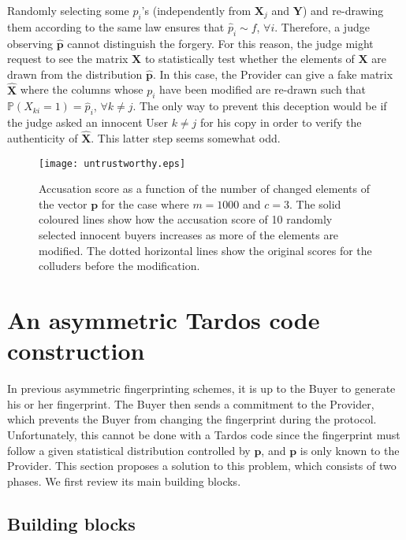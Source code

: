 \documentclass{article}
\begin{document}
Randomly selecting some $p_{i}$'s (independently from $\mathbf{X}_j$
and $\mathbf{Y}$) and re-drawing them according to the same law
ensures that $\hat{p}_{i}\sim f$, $\forall i$.  Therefore, a judge
observing $\hat{\mathbf{p}}$ cannot distinguish the forgery.  For this
reason, the judge might request to see the matrix $\mathbf{X}$ to statistically test
whether the elements of $\mathbf{X}$ are drawn from the distribution
$\hat{\mathbf{p}}$. In this case, the
Provider can give a fake matrix $\hat{\mathbf{X}}$ where the columns
whose $p_{i}$ have been modified are re-drawn such that
$\mathbb{P}(X_{ki} = 1) = \hat{p}_i$, $\forall k\neq j$. 
The only way to prevent this deception would be if the
judge asked an innocent User $k\neq j$ for his copy in order to verify
the authenticity of $\hat{\mathbf{X}}$.  This latter step seems
somewhat odd.


\begin{figure}
  \centering
  \texttt{[image: untrustworthy.eps]}
  \caption{
Accusation score as a function of the number of changed elements of
the vector $\mathbf{p}$ for the case where $m=1000$ and $c=3$.
The solid coloured lines show how the accusation score of 10 randomly selected innocent buyers
increases as
more of the elements are modified.
The dotted horizontal lines show the original scores for the colluders
before the modification.}

  \label{fig:untrustworthy}
\end{figure}


\section{An asymmetric Tardos code construction}
\label{sec:Construction}

In previous asymmetric fingerprinting schemes, it is up to the Buyer
to generate his or her fingerprint.  The Buyer then sends a commitment
to the Provider, which prevents the Buyer from changing the fingerprint during the
protocol. Unfortunately, this cannot be done with a Tardos code since the
fingerprint must follow a given statistical distribution controlled by
$\mathbf{p}$, and $\mathbf{p}$ is only known to the Provider. This section
proposes a solution to this problem, which consists of two phases.  We first review its main building blocks.

\subsection{Building blocks}
\end{document}
